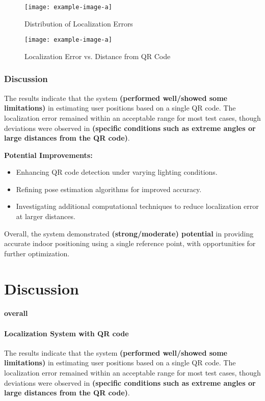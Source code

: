 \begin{figure}[h]
	\centering
	\texttt{[image: example-image-a]} %
	\caption{Distribution of Localization Errors}
	\label{fig:error_distribution}
\end{figure}

\begin{figure}[h]
	\centering
	\texttt{[image: example-image-a]} %
	\caption{Localization Error vs. Distance from QR Code}
	\label{fig:error_vs_distance}
\end{figure}

\subsubsection*{Discussion}
The results indicate that the system \textbf{(performed well/showed some limitations)} in estimating user positions based on a single QR code. The localization error remained within an acceptable range for most test cases, though deviations were observed in \textbf{(specific conditions such as extreme angles or large distances from the QR code)}.

\textbf{Potential Improvements:}
\begin{itemize}
	\item Enhancing QR code detection under varying lighting conditions.
	\item Refining pose estimation algorithms for improved accuracy.
	\item Investigating additional computational techniques to reduce localization error at larger distances.
\end{itemize}

Overall, the system demonstrated \textbf{(strong/moderate) potential} in providing accurate indoor positioning using a single reference point, with opportunities for further optimization.



\section{Discussion}
\paragraph{overall}

\paragraph{Localization System with QR code}
The results indicate that the system \textbf{(performed well/showed some limitations)} in estimating user positions based on a single QR code. The localization error remained within an acceptable range for most test cases, though deviations were observed in \textbf{(specific conditions such as extreme angles or large distances from the QR code)}.

